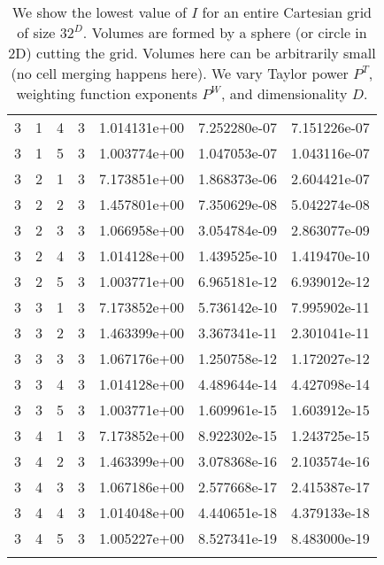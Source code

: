 \documentclass{article}
\begin{document}
\begin{table}
\begin{center}
\begin{tabular}{|cccc|ccc|}
3 & 1 & 4 & 3 & 1.014131e+00 & 7.252280e-07 & 7.151226e-07 \\ 
3 & 1 & 5 & 3 & 1.003774e+00 & 1.047053e-07 & 1.043116e-07 \\ 
3 & 2 & 1 & 3 & 7.173851e+00 & 1.868373e-06 & 2.604421e-07 \\ 
3 & 2 & 2 & 3 & 1.457801e+00 & 7.350629e-08 & 5.042274e-08 \\ 
3 & 2 & 3 & 3 & 1.066958e+00 & 3.054784e-09 & 2.863077e-09 \\ 
3 & 2 & 4 & 3 & 1.014128e+00 & 1.439525e-10 & 1.419470e-10 \\ 
3 & 2 & 5 & 3 & 1.003771e+00 & 6.965181e-12 & 6.939012e-12 \\ 
3 & 3 & 1 & 3 & 7.173852e+00 & 5.736142e-10 & 7.995902e-11 \\ 
3 & 3 & 2 & 3 & 1.463399e+00 & 3.367341e-11 & 2.301041e-11 \\ 
3 & 3 & 3 & 3 & 1.067176e+00 & 1.250758e-12 & 1.172027e-12 \\ 
3 & 3 & 4 & 3 & 1.014128e+00 & 4.489644e-14 & 4.427098e-14 \\ 
3 & 3 & 5 & 3 & 1.003771e+00 & 1.609961e-15 & 1.603912e-15 \\ 
3 & 4 & 1 & 3 & 7.173852e+00 & 8.922302e-15 & 1.243725e-15 \\ 
3 & 4 & 2 & 3 & 1.463399e+00 & 3.078368e-16 & 2.103574e-16 \\ 
3 & 4 & 3 & 3 & 1.067186e+00 & 2.577668e-17 & 2.415387e-17 \\ 
3 & 4 & 4 & 3 & 1.014048e+00 & 4.440651e-18 & 4.379133e-18 \\ 
3 & 4 & 5 & 3 & 1.005227e+00 & 8.527341e-19 & 8.483000e-19 \\ 

  \label{tab::worst_unmerged_inv_conv}
\end{tabular}
\end{center}
\caption
    {
      We show the lowest value of
      $I$ for an entire Cartesian grid of size $32^D$.
      Volumes are  formed by a sphere (or circle in 2D) cutting the
      grid.   Volumes here can be arbitrarily small (no cell merging
      happens here).
      We vary Taylor power $P^T$, weighting
      function exponents $P^W$, and dimensionality $D$. 
    }
\end{table}
\end{document}

